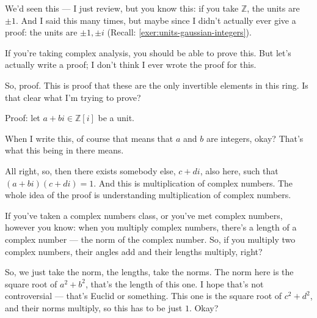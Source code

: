 \begin{speech}[00:01:40 - 00:02:45]
We'd seen this --- I just review, but you know this: if you take $\mathbb{Z}$,  the units are $\pm 1$. And I said this many times, but maybe since I didn't actually ever give a proof:  the units are $\pm 1, \pm i$ (Recall: \cref{exer:units-gaussian-integers}).

If you're taking complex analysis, you should be able to prove this. But let's actually write a proof; I don't think I ever wrote the proof for this.

So, proof.  This is proof that these are the only invertible elements in this ring. Is that clear what I'm trying to prove?

Proof: let $a + bi \in \mathbb{Z}[i]$ be a unit. 
\end{speech}

\begin{speech}[00:02:45 - 00:03:55]
When I write this, of course that means that $a$ and $b$ are integers, okay?  That's what this being in there means.

All right, so, then there exists somebody else, $c + di$, also here,  such that $(a+bi)(c+di) = 1$.  And this is multiplication of complex numbers. The whole idea of the proof is understanding multiplication of complex numbers.

If you've taken a complex numbers class, or you've met complex numbers, however you know: when you multiply complex numbers, there's a length of a complex number  --- the norm of the complex number. So, if you multiply two complex numbers, their angles add and their lengths multiply, right?

So, we just take the norm, the lengths, take the norms.  The norm here is the square root of $a^2 + b^2$,  that's the length of this one. I hope that's not controversial --- that's Euclid or something. This one is the square root of $c^2 + d^2$,  and their norms multiply, so this has to be just $1$.  Okay?
\end{speech}

